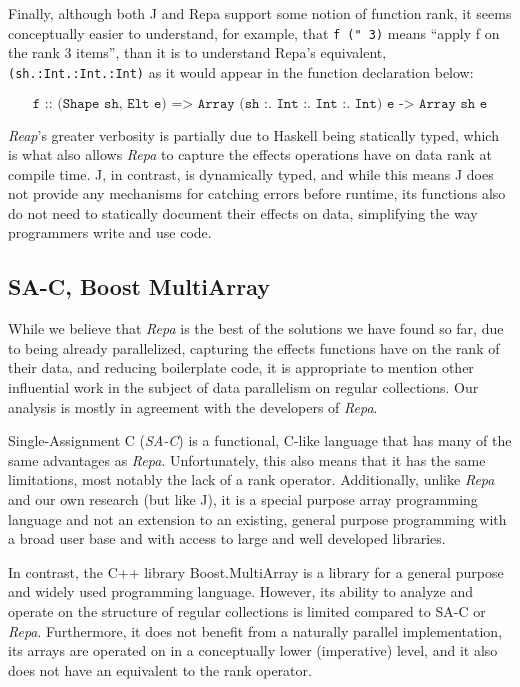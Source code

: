 Finally, although both J and Repa support some notion of function rank, 
it seems conceptually easier to understand, for example, 
that \texttt{f (" 3)} means ``apply f on the rank 3 items'', than it is to understand Repa's equivalent, 
\texttt{(sh.:Int.:Int.:Int)} as it would appear in the function declaration below: 

\[\texttt{f :: (Shape sh, Elt e) => Array (sh :. Int :. Int :. Int) e -> Array sh e} \]

\noindent \textit{Reap}'s greater verbosity is partially due to Haskell being statically typed, 
which is what also allows \textit{Repa} to capture the effects operations have on data rank at compile time. 
J, in contrast, is dynamically typed, and while this means J does not provide any mechanisms for catching errors before runtime, 
its functions also do not need to statically document their effects on data, simplifying the way programmers write and use code.

\subsection{SA-C, Boost MultiArray}
While we believe that \textit{Repa} is the best of the solutions we have found so far, 
due to being already parallelized, capturing the effects functions have on the rank of their data, 
and reducing boilerplate code, 
it is appropriate to mention other influential work in the subject of data parallelism on regular collections.
Our analysis is mostly in agreement with the developers of \textit{Repa}\cite{dph}.

Single-Assignment C (\textit{SA-C}) is a functional, C-like language 
that has many of the same advantages as \textit{Repa}\cite{dph}\cite{sac}.
Unfortunately, this also means that it has the same limitations, most notably the lack of a rank operator.
Additionally, unlike \textit{Repa} and our own research (but like J), 
it is a special purpose array programming language and 
not an extension to an existing, general purpose programming with a broad user base and 
with access to large and well developed libraries.

In contrast, the C++ library Boost.MultiArray is a library for a general purpose and widely used programming language\cite{boost}.
However, its ability to analyze and operate on the structure of regular collections is limited compared to SA-C or \textit{Repa}.
Furthermore, it does not benefit from a naturally parallel implementation, 
its arrays are operated on in a conceptually lower (imperative) level, 
and it also does not have an equivalent to the rank operator. 
